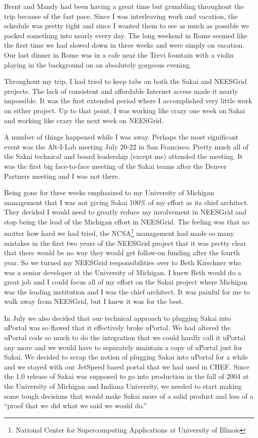 \documentclass[12pt]{book}
\begin{document}
Brent and Mandy had been having a great time but
grumbling throughout the trip because of the fast
pace.  Since I was interleaving work
and vacation, the schedule was pretty tight and since
I wanted them to see as much as possible we packed
something into nearly every day.  The long weekend
in Rome seemed like the first time we had slowed
down in three weeks and were simply on vacation.
Our last dinner in Rome was in a cafe near the Trevi
fountain with a violin playing in the background
on an absolutely gorgeous evening.

Throughout my trip, I had tried to keep tabs on
both the Sakai and NEESGrid projects.  The lack
of consistent and affordable Internet access made
it nearly impossible.  It was the first extended
period where I accomplished very little work
on either project.  Up to that point, I was working
like crazy one week on Sakai and working like
crazy the next week on NEESGrid.

A number of things happened while I was away.  Perhaps
the most significant event was the Alt-I-Lab meeting
July 20-22 in San Francisco.  Pretty much all of the
Sakai technical and board leadership (except me) attended
the meeting.  It was the first big face-to-face
meeting of the Sakai teams after the Denver Partners
meeting and I was not there.

Being gone for three weeks emphasized to my University
of Michigan management that I was not giving Sakai
100\% of my effort as its chief architect.  They
decided I would need to greatly reduce my involvement
in NEESGrid and stop being the lead of the Michigan
effort in NEESGrid.  The feeling was that no matter
how hard we had tried, the
NCSA\footnote{National Center for Supercomputing Applications at University of Illinois}
management had made so many mistakes
in the first two years of the NEESGrid project
that it was pretty clear that
there would be no way they would get
follow-on funding after the
fourth year.
So we turned my NEESGrid responsibilities
over to Beth Kirschner who was a senior developer
at the University of Michigan.  I knew Beth would do a great
job and I could focus all of my effort on the Sakai
project where Michigan was the leading institution
and I was the chief architect.  It was painful for
me to walk away from NEESGrid, but I knew it was for
the best.

In July we also decided that our technical approach
to plugging Sakai into uPortal was so flawed that
it effectively broke uPortal.  We had altered the
uPortal code so much to do the integration that
we could hardly call it uPortal any more and we would
have to separately maintain a copy of
uPortal just for Sakai.
We decided to scrap the notion of plugging Sakai
into uPortal for a while and we stayed with
our JetSpeed based portal that we had used
in CHEF.  Since the 1.0
release of Sakai was supposed to go into production in
the fall of 2004 at the University of Michigan
and Indiana University, we needed to start making
some tough decisions that would make Sakai more of
a solid product and less of a ``proof that we did
what we said we would do.''
\end{document}

